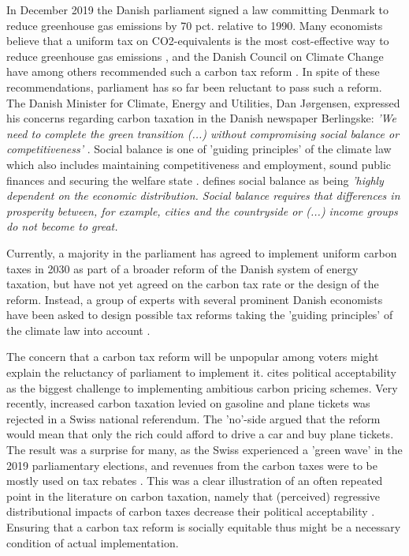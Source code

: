 In December 2019 the Danish parliament signed a law committing Denmark to reduce greenhouse gas emissions by 70 pct. relative to 1990. Many economists believe that a uniform tax on CO2-equivalents is the most cost-effective way to reduce greenhouse gas emissions \citep{mankiw2009smart}, and the Danish Council on Climate Change have among others recommended such a carbon tax reform \citep{klimaraad2021, Kraka2020, dmoer2021}. In spite of these recommendations, parliament has so far been reluctant to pass such a reform. The Danish Minister for Climate, Energy and Utilities, Dan Jørgensen, expressed his concerns regarding carbon taxation in the Danish newspaper Berlingske: \textit{'We need to complete the green transition (...) without compromising social balance or competitiveness'} \citep{berlingske2020}. Social balance is one of 'guiding principles' of the climate law which also includes maintaining competitiveness and employment, sound public finances and securing the welfare state \citep{klimaloven}. \cite{klimaraad2021} defines social balance as being \textit{'highly dependent on the economic distribution. Social balance requires that differences in prosperity between, for example, cities and the countryside or (...) income groups do not become to great.} 

Currently, a majority in the parliament has agreed to implement uniform carbon taxes in 2030 as part of a broader reform of the Danish system of energy taxation, but have not yet agreed on the carbon tax rate or the design of the reform. Instead, a group of experts with several prominent Danish economists have been asked to design possible tax reforms taking the 'guiding principles' of the climate law into account \citep{gronskattereform2020}.

The concern that a carbon tax reform will be unpopular among voters might explain the reluctancy of parliament to implement it. \cite{klenert2018making} cites political acceptability as the biggest challenge to implementing ambitious carbon pricing schemes. Very recently, increased carbon taxation levied on gasoline and plane tickets was rejected in a Swiss national referendum. The 'no'-side argued  that the reform would mean that only the rich could afford to drive a car and buy plane tickets. The result was a surprise for many, as the Swiss experienced a 'green wave' in the 2019 parliamentary elections, and revenues from the carbon taxes were to be mostly used on tax rebates \citep{swissreferendumjune2021}. This was a clear illustration of an often repeated point in the literature on carbon taxation, namely that (perceived) regressive distributional impacts of carbon taxes decrease their political acceptability \citep{poterba1991tax, BARANZINI2000, klenert2018making,meta_carbontax}. Ensuring that a carbon tax reform is socially equitable thus might be a necessary condition of actual implementation.

